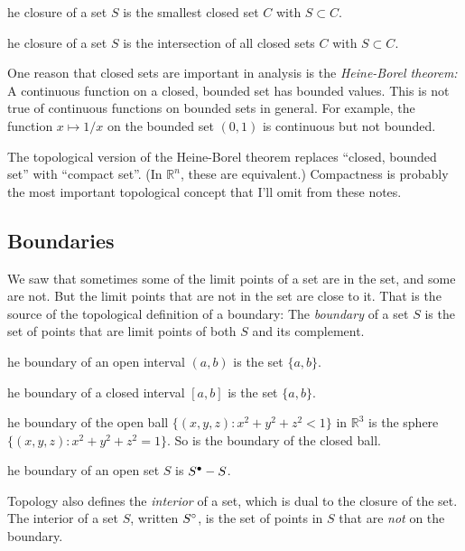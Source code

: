 \documentclass{article}
\def\R{{\mathbb R}}
\def\Rn{{\R^n}}
\newcounter{exercisecounter}\setcounter{exercisecounter}{1}
\def\Exercise.#1\par{{\item\small \makebox{\bf Exercise \number\theexercisecounter.\hspace{0.5em}}\unskip\ignorespaces#1\addtocounter{exercisecounter}{1}}}
\def\inter#1{\smash{#1}^\circ\vphantom{#1}}
\def\clos#1{\smash{#1}^\bullet\vphantom{#1}}
\begin{document}
\begin{itemize}
\Exercise. The closure of a set $S$ is the smallest closed set $C$
with $S\subset C$.

\Exercise. The closure of a set $S$ is the intersection of all closed sets $C$
with $S\subset C$.


\end{itemize}

One reason that closed sets are important in analysis is the
{\em Heine-Borel theorem:\/} A continuous function on a closed,
bounded set has bounded values.  This is not true of continuous
functions on bounded sets in general.  For example, the function $x
\mapsto 1/x$ on the bounded set $(0, 1)$ is continuous but not
bounded.

The topological version of the Heine-Borel theorem replaces ``closed,
bounded set'' with ``compact set''.  (In $\Rn$, these are equivalent.)
Compactness is probably the most important topological concept that
I'll omit from these notes.

\subsection*{Boundaries}

We saw that sometimes some of the limit points of a set are in the
set, and some are not.  But the limit points that are not in the set
are close to it.  That is the source of the topological definition of
a boundary: The {\em boundary\/} of a set $S$ is the set of points
that are limit points of both $S$ and its complement.

\begin{itemize}
\Exercise. The boundary of an open interval $(a, b)$ is the set $\{a, b\}$.

\Exercise. The boundary of a closed interval $[a, b]$ is the set $\{a, b\}$.

\Exercise. The boundary of the open ball $\{(x,y,z) : x^2 + y^2 + z^2 <
1\}$ in $\R^3$ is the sphere  $\{(x,y,z) : x^2 + y^2 + z^2 = 1\}$.   So
is the boundary of the closed ball. 

\Exercise. The boundary of an open set $S$ is $\clos S - S$.

\end{itemize}

Topology also defines the {\em interior\/} of a set, which is dual to
the closure of the set.  The interior of a set $S$, written $\inter
S$, is the set of points in $S$ that are {\em not\/} on the boundary.
\end{document}
